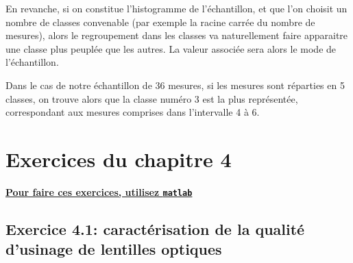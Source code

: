 \documentclass[main.tex]{subfiles}
\begin{document}
En revanche, si on constitue l'histogramme de l'échantillon, et que l'on choisit un nombre de classes convenable (par exemple la racine carrée du nombre de mesures), alors le regroupement dans les classes va naturellement faire apparaitre une classe plus peuplée que les autres. La valeur associée sera alors le mode de l'échantillon.

Dans le cas de notre échantillon de 36 mesures, si les mesures sont réparties en 5 classes, on trouve alors que la classe numéro 3 est la plus représentée, correspondant aux mesures comprises dans l'intervalle 4 à 6.


\section{Exercices du chapitre 4}


\begin{center}
    \Large \bf {\underline{Pour faire ces exercices, utilisez \texttt{matlab}}}
\end{center}

\subsection*{Exercice 4.1: caractérisation de la qualité d'usinage de lentilles optiques}
\end{document}
